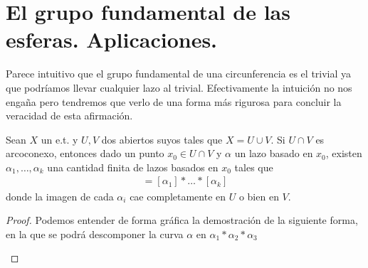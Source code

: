 \section{El grupo fundamental de las esferas. Aplicaciones.}

Parece intuitivo que el grupo fundamental de una circunferencia es el trivial ya que podríamos llevar cualquier lazo al trivial. Efectivamente la intuición no nos engaña pero tendremos que verlo de una forma más rigurosa para concluir la veracidad de esta afirmación.

\begin{lema}
    Sean $X$ un e.t. y $U,V$ dos abiertos suyos tales que $X=U\cup V$. Si $U\cap V$ es arcoconexo, entonces dado un punto $x_0\in U\cap V$ y $\alpha$ un lazo basado en $x_0$, existen $\alpha_1,\dots,\alpha_k$ una cantidad finita de lazos basados en $x_0$ tales que 
    \begin{gather*}
        [\alpha] = [\alpha_1]\ast \dots \ast [\alpha_k]
    \end{gather*}
    donde la imagen de cada $\alpha_i$ cae completamente en $U$ o bien en $V$.
    \begin{proof}
        Podemos entender de forma gráfica la demostración de la siguiente forma, en la que se podrá descomponer la curva $\alpha$ en $\alpha_1 \ast \alpha_2 \ast \alpha_3$

        \begin{figure}[H]
            \centering
\end{figure}
\end{proof}
\end{lema}
